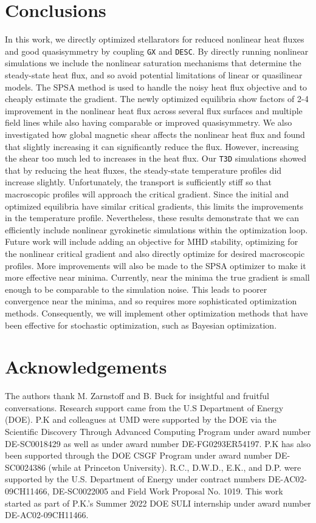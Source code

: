 \documentclass{jpp}
\begin{document}
\section{Conclusions}\label{Conclusions}
In this work, we directly optimized stellarators for reduced nonlinear heat fluxes and good quasisymmetry by coupling {\tt GX} and {\tt DESC}. By directly running nonlinear simulations we include the nonlinear saturation mechanisms that determine the steady-state heat flux, and so avoid potential limitations of linear or quasilinear models. The SPSA method is used to handle the noisy heat flux objective and to cheaply estimate the gradient. The newly optimized equilibria show factors of 2-4 improvement in the nonlinear heat flux across several flux surfaces and multiple field lines while also having comparable or improved quasisymmetry. We also investigated how global magnetic shear affects the nonlinear heat flux and found that slightly increasing it can significantly reduce the flux. However, increasing the shear too much led to increases in the heat flux. Our {\tt T3D} simulations showed that by reducing the heat fluxes, the steady-state temperature profiles did increase slightly. Unfortunately, the transport is sufficiently stiff so that macroscopic profiles will approach the critical gradient. Since the initial and optimized equilibria have similar critical gradients, this limits the improvements in the temperature profile. Nevertheless, these results demonstrate that we can efficiently include nonlinear gyrokinetic simulations within the optimization loop. Future work will include adding an objective for MHD stability, optimizing for the nonlinear critical gradient and also directly optimize for desired macroscopic profiles. More improvements will also be made to the SPSA optimizer to make it more effective near minima. Currently, near the minima the true gradient is small enough to be comparable to the simulation noise. This leads to poorer convergence near the minima, and so requires more sophisticated optimization methods. Consequently, we will implement other optimization methods that have been effective for stochastic optimization, such as Bayesian optimization.

\section{Acknowledgements}
The authors thank M. Zarnstoff and B. Buck for insightful and fruitful conversations. Research support came from the U.S Department of Energy (DOE). P.K and colleagues at UMD were supported by the DOE via the Scientific Discovery Through Advanced Computing Program under award number DE-SC0018429 as well as under award number DE-FG0293ER54197. P.K has also been supported through the DOE CSGF Program under award number DE-SC0024386 (while at Princeton University). R.C., D.W.D., E.K., and D.P. were supported by the U.S. Department of Energy under contract numbers DE-AC02-09CH11466,
DE-SC0022005 and Field Work Proposal No. 1019. This work started as part of P.K.'s Summer 2022 DOE SULI internship under award number DE-AC02-09CH11466. 
\end{document}
